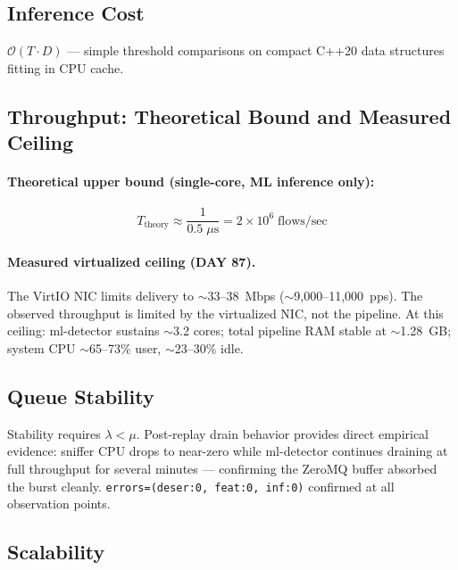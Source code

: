\documentclass[11pt,a4paper]{article}
\begin{document}
    \subsection{Inference Cost}

    $\mathcal{O}(T \cdot D)$ --- simple threshold comparisons on compact C++20 data structures
    fitting in CPU cache.

    \subsection{Throughput: Theoretical Bound and Measured Ceiling}

    \paragraph{Theoretical upper bound (single-core, ML inference only):}
    \begin{equation}
        T_{\text{theory}} \approx \frac{1}{0.5\;\mu\text{s}} = 2 \times 10^6\;\text{flows/sec}
    \end{equation}

    \paragraph{Measured virtualized ceiling (DAY 87).}
    The VirtIO NIC limits delivery to ${\sim}$33--38~Mbps (${\sim}$9,000--11,000~pps).
    The observed throughput is limited by the virtualized NIC, not the pipeline.
    At this ceiling: ml-detector sustains ${\sim}$3.2 cores; total pipeline RAM stable at
    ${\sim}$1.28~GB; system CPU ${\sim}$65--73\% user, ${\sim}$23--30\% idle.

    \subsection{Queue Stability}

    Stability requires $\lambda < \mu$. Post-replay drain behavior provides direct empirical
    evidence: sniffer CPU drops to near-zero while ml-detector continues draining at full
    throughput for several minutes --- confirming the ZeroMQ buffer absorbed the burst cleanly.
    \texttt{errors=(deser:0, feat:0, inf:0)} confirmed at all observation points.

    \subsection{Scalability}
\end{document}
